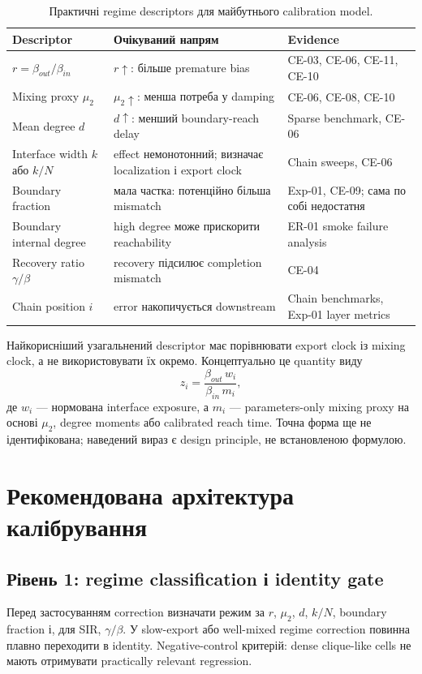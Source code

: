 \documentclass[11pt,a4paper]{article}
\begin{document}
\begin{table}[H]
\centering
\caption{Практичні regime descriptors для майбутнього calibration model.}
\begin{tabular}{p{3.1cm}p{4.2cm}p{7.0cm}}
\toprule
Descriptor & Очікуваний напрям & Evidence\\
\midrule
$r=\beta_{out}/\beta_{in}$ & $r\uparrow$: більше premature bias & CE-03, CE-06, CE-11, CE-10\\
Mixing proxy $\mu_2$ & $\mu_2\uparrow$: менша потреба у damping & CE-06, CE-08, CE-10\\
Mean degree $d$ & $d\uparrow$: менший boundary-reach delay & Sparse benchmark, CE-06\\
Interface width $k$ або $k/N$ & effect немонотонний; визначає localization і export clock & Chain sweeps, CE-06\\
Boundary fraction & мала частка: потенційно більша mismatch & Exp-01, CE-09; сама по собі недостатня\\
Boundary internal degree & high degree може прискорити reachability & ER-01 smoke failure analysis\\
Recovery ratio $\gamma/\beta$ & recovery підсилює completion mismatch & CE-04\\
Chain position $i$ & error накопичується downstream & Chain benchmarks, Exp-01 layer metrics\\
\bottomrule
\end{tabular}
\end{table}

Найкорисніший узагальнений descriptor має порівнювати export clock із mixing
clock, а не використовувати їх окремо. Концептуально це quantity виду
\[
 z_i = \frac{\beta_{out}\,w_i}{\beta_{in}\,m_i},
\]
де $w_i$ --- нормована interface exposure, а $m_i$ --- parameters-only mixing
proxy на основі $\mu_2$, degree moments або calibrated reach time. Точна форма
ще не ідентифікована; наведений вираз є design principle, не встановленою
формулою.

\section{Рекомендована архітектура калібрування}

\subsection{Рівень 1: regime classification і identity gate}

Перед застосуванням correction визначати режим за
$r$, $\mu_2$, $d$, $k/N$, boundary fraction і, для SIR, $\gamma/\beta$.
У slow-export або well-mixed regime correction повинна плавно переходити в
identity. Negative-control критерій: dense clique-like cells не мають отримувати
practically relevant regression.
\end{document}

